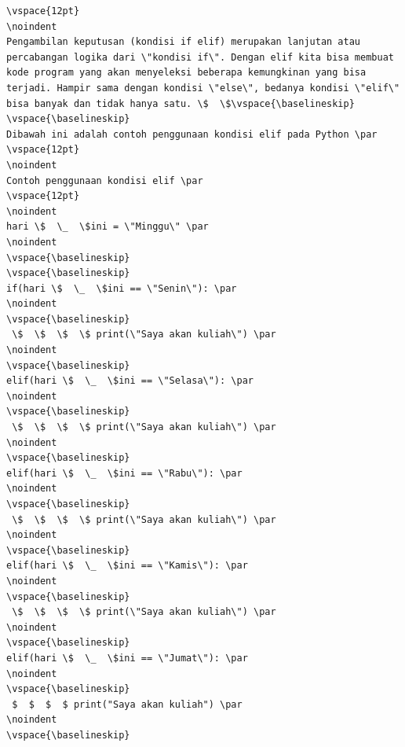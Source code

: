 \begin{verbatim}
\vspace{12pt}
\noindent 
Pengambilan keputusan (kondisi if elif) merupakan lanjutan atau percabangan logika dari \"kondisi if\". Dengan elif kita bisa membuat kode program yang akan menyeleksi beberapa kemungkinan yang bisa terjadi. Hampir sama dengan kondisi \"else\", bedanya kondisi \"elif\" bisa banyak dan tidak hanya satu. \$  \$\vspace{\baselineskip}
\vspace{\baselineskip}
Dibawah ini adalah contoh penggunaan kondisi elif pada Python \par
\vspace{12pt}
\noindent 
Contoh penggunaan kondisi elif \par
\vspace{12pt}
\noindent 
hari \$  \_  \$ini = \"Minggu\" \par
\noindent 
\vspace{\baselineskip}
\vspace{\baselineskip}
if(hari \$  \_  \$ini == \"Senin\"): \par
\noindent 
\vspace{\baselineskip}
 \$  \$  \$  \$ print(\"Saya akan kuliah\") \par
\noindent 
\vspace{\baselineskip}
elif(hari \$  \_  \$ini == \"Selasa\"): \par
\noindent 
\vspace{\baselineskip}
 \$  \$  \$  \$ print(\"Saya akan kuliah\") \par
\noindent 
\vspace{\baselineskip}
elif(hari \$  \_  \$ini == \"Rabu\"): \par
\noindent 
\vspace{\baselineskip}
 \$  \$  \$  \$ print(\"Saya akan kuliah\") \par
\noindent 
\vspace{\baselineskip}
elif(hari \$  \_  \$ini == \"Kamis\"): \par
\noindent 
\vspace{\baselineskip}
 \$  \$  \$  \$ print(\"Saya akan kuliah\") \par
\noindent 
\vspace{\baselineskip}
elif(hari \$  \_  \$ini == \"Jumat\"): \par
\noindent 
\vspace{\baselineskip}
 $  $  $  $ print("Saya akan kuliah") \par
\noindent 
\vspace{\baselineskip}

\end{verbatim}
